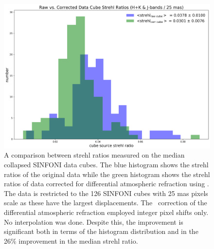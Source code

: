 \begin{figure}[H]
\centering \subfigure
\includegraphics[width=16cm]{figures/SINFO_DAR_2014_2015_2016_HK_J_0_025_strehl20.png} 
\caption[]
	{\footnotesize  A comparison between strehl ratios measured on the median collapsed SINFONI data cubes.  The blue histogram shows the strehl ratios of the original
	data while the green histogram shows the strehl ratios of data corrected for differential atmospheric refraction using \hdrldar.  The data is restricted to the 126 SINFONI
	cubes with 25 mas pixels scale as these have the largest displacements.  The \hdrldar\ correction of the differential atmospheric refraction employed integer pixel shifts only.  
	No interpolation was done.  Despite this, the improvement is significant both in terms of the histogram distribution and in the 26\% improvement in the median strehl ratio.
	}
	\label{fig:strehl}
\end{figure}





